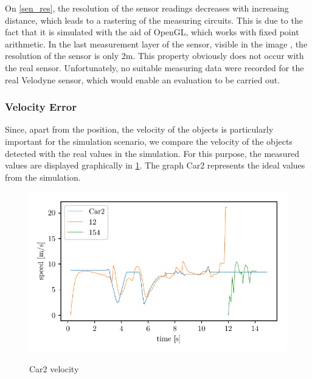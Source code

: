\documentclass[11pt,oneside,openright]{mpreport}
\begin{document}
On \cref{sen_res}, the resolution of the sensor readings decreases with increasing distance, which leads to a rastering of the measuring circuits. 
This is due to the fact that it is simulated with the aid of OpenGL, which works with fixed point arithmetic. In the last measurement layer of the sensor, visible in the image ,
the resolution of the sensor is only 2m.
This property obviously does not occur with the real sensor. Unfortunately, no suitable measuring data were recorded for the real Velodyne sensor, which would enable an evaluation to be carried out.

\subsubsection{Velocity Error}


Since, apart from the position, the velocity of the objects is particularly important for the simulation scenario, we compare the velocity of the objects detected with the real values in the simulation.
For this purpose, the measured values are displayed graphically in \cref {car2_speed}. The graph Car2 represents the ideal values from the simulation.

\begin{figure}[!htb]
  \caption{Car2 velocity} 
  \centering
  \includegraphics[width=\textwidth]{bilder/Car2_speed.pdf}
 \label{car2_speed}
\end{figure}
\end{document}
